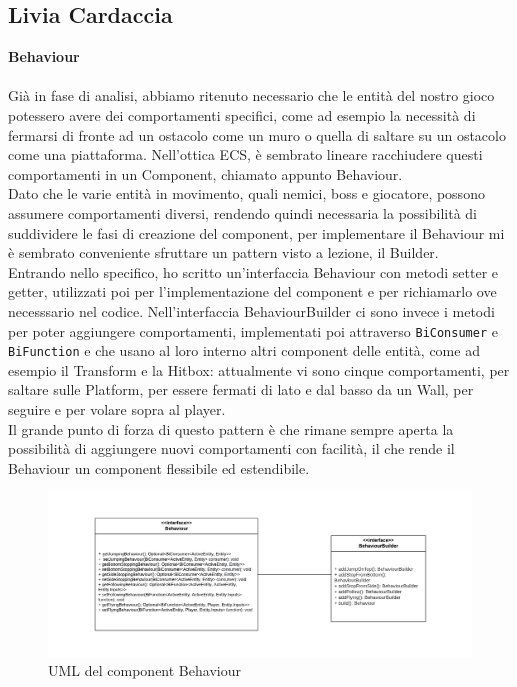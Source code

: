 \documentclass[a4paper,12pt]{report}
\begin{document}
\subsection{Livia Cardaccia}
\textbf{Behaviour}\\
\\
Già in fase di analisi, abbiamo ritenuto necessario che le entità del nostro gioco potessero avere dei comportamenti specifici, come ad esempio la necessità di fermarsi di fronte ad un ostacolo come un muro o quella di saltare su un ostacolo come una piattaforma.
Nell'ottica ECS, è sembrato lineare racchiudere questi comportamenti in un Component, chiamato appunto Behaviour.\\ Dato che le varie entità in movimento, quali nemici, boss e giocatore, possono assumere comportamenti diversi, rendendo quindi necessaria la possibilità di suddividere le fasi di creazione del component, per implementare il Behaviour mi è sembrato conveniente sfruttare un pattern visto a lezione, il Builder.\\ Entrando nello specifico, ho scritto un'interfaccia Behaviour con metodi setter e getter, utilizzati poi per l'implementazione del component e per richiamarlo ove necesssario nel codice.
Nell'interfaccia BehaviourBuilder ci sono invece i metodi per poter aggiungere comportamenti, implementati poi attraverso \texttt{BiConsumer} e \texttt{BiFunction} e che usano al loro interno altri component delle entità, come ad esempio il Transform e la Hitbox: attualmente vi sono cinque comportamenti, per saltare sulle Platform, per essere fermati di lato e dal basso da un Wall, per seguire e per volare sopra al player.\\
Il grande punto di forza di questo pattern è che rimane sempre aperta la possibilità di aggiungere nuovi comportamenti con facilità, il che rende il Behaviour un component flessibile ed estendibile.

\begin{figure}[ht]
\includegraphics[width=1\textwidth]{umlBehaviour.png}
\caption{UML del component Behaviour}
\label{fig:schgen}
\end{figure}
\end{document}

